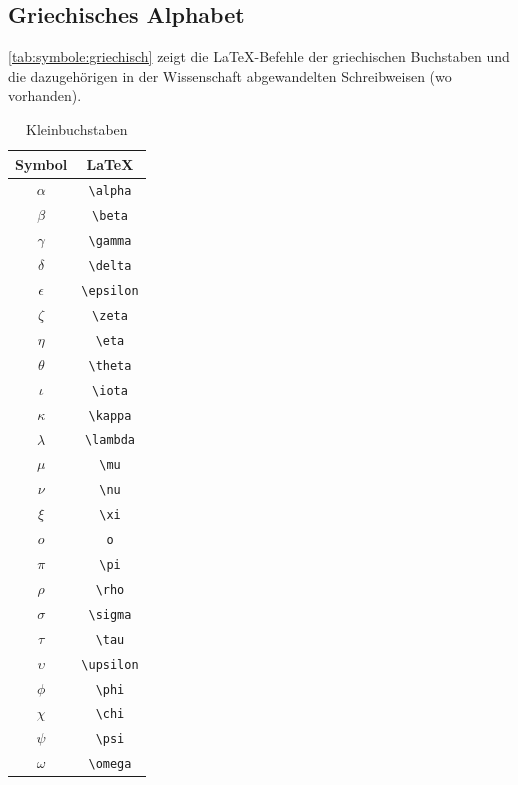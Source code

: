 		\subsection{Griechisches Alphabet}
			\autoref{tab:symbole:griechisch} zeigt die \LaTeX-Befehle der griechischen Buchstaben und die dazugehörigen in der Wissenschaft abgewandelten Schreibweisen (wo vorhanden).
			\begin{table}[ht]
				\begin{subtable}[b]{0.23\linewidth}
					\begin{tabular}{c|c}
						Symbol & \LaTeX\\\hline
						$\alpha$ & \lstinline|\alpha|\\
						$\beta$ & \lstinline|\beta|\\
						$\gamma$ & \lstinline|\gamma|\\
						$\delta$ & \lstinline|\delta|\\
						$\epsilon$ & \lstinline|\epsilon|\\
						$\zeta$ & \lstinline|\zeta|\\
						$\eta$ & \lstinline|\eta|\\
						$\theta$ & \lstinline|\theta|\\
						$\iota$ & \lstinline|\iota|\\
						$\kappa$ & \lstinline|\kappa|\\
						$\lambda$ & \lstinline|\lambda|\\
						$\mu$ & \lstinline|\mu|\\
						$\nu$ & \lstinline|\nu|\\
						$\xi$ & \lstinline|\xi|\\
						$o$ & \lstinline|o|\\
						$\pi$ & \lstinline|\pi|\\
						$\rho$ & \lstinline|\rho|\\
						$\sigma$ & \lstinline|\sigma|\\
						$\tau$ & \lstinline|\tau|\\
						$\upsilon$ & \lstinline|\upsilon|\\
						$\phi$ & \lstinline|\phi|\\
						$\chi$ & \lstinline|\chi|\\
						$\psi$ & \lstinline|\psi|\\
						$\omega$ & \lstinline|\omega|\\
					\end{tabular}
					\caption{Kleinbuchstaben}

\end{subtable}
\end{table}
